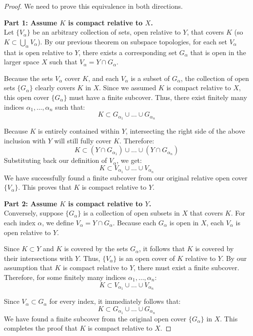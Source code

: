 \documentclass{article}
\theoremstyle{mythm}
\begin{document}
\begin{proof}
We need to prove this equivalence in both directions.

\textbf{Part 1: Assume $K$ is compact relative to $X$.} \\
Let $\{V_\alpha\}$ be an arbitrary collection of sets, open relative to $Y$, that covers $K$ (so $K \subset \bigcup_\alpha V_\alpha$).
By our previous theorem on subspace topologies, for each set $V_\alpha$ that is open relative to $Y$, there exists a corresponding set $G_\alpha$ that is open in the larger space $X$ such that $V_\alpha = Y \cap G_\alpha$.

Because the sets $V_\alpha$ cover $K$, and each $V_\alpha$ is a subset of $G_\alpha$, the collection of open sets $\{G_\alpha\}$ clearly covers $K$ in $X$.
Since we assumed $K$ is compact relative to $X$, this open cover $\{G_\alpha\}$ must have a finite subcover. Thus, there exist finitely many indices $\alpha_1, \dots, \alpha_n$ such that:
\[ K \subset G_{\alpha_1} \cup \dots \cup G_{\alpha_n} \]

Because $K$ is entirely contained within $Y$, intersecting the right side of the above inclusion with $Y$ will still fully cover $K$. Therefore:
\[ K \subset (Y \cap G_{\alpha_1}) \cup \dots \cup (Y \cap G_{\alpha_n}) \]
Substituting back our definition of $V_\alpha$, we get:
\[ K \subset V_{\alpha_1} \cup \dots \cup V_{\alpha_n} \]
We have successfully found a finite subcover from our original relative open cover $\{V_\alpha\}$. This proves that $K$ is compact relative to $Y$.

\textbf{Part 2: Assume $K$ is compact relative to $Y$.} \\
Conversely, suppose $\{G_\alpha\}$ is a collection of open subsets in $X$ that covers $K$.
For each index $\alpha$, we define $V_\alpha = Y \cap G_\alpha$. Because each $G_\alpha$ is open in $X$, each $V_\alpha$ is open relative to $Y$.

Since $K \subset Y$ and $K$ is covered by the sets $G_\alpha$, it follows that $K$ is covered by their intersections with $Y$. Thus, $\{V_\alpha\}$ is an open cover of $K$ relative to $Y$.
By our assumption that $K$ is compact relative to $Y$, there must exist a finite subcover. Therefore, for some finitely many indices $\alpha_1, \dots, \alpha_n$:
\[ K \subset V_{\alpha_1} \cup \dots \cup V_{\alpha_n} \]

Since $V_\alpha \subset G_\alpha$ for every index, it immediately follows that:
\[ K \subset G_{\alpha_1} \cup \dots \cup G_{\alpha_n} \]
We have found a finite subcover from the original open cover $\{G_\alpha\}$ in $X$. This completes the proof that $K$ is compact relative to $X$.
\end{proof}
\end{document}

